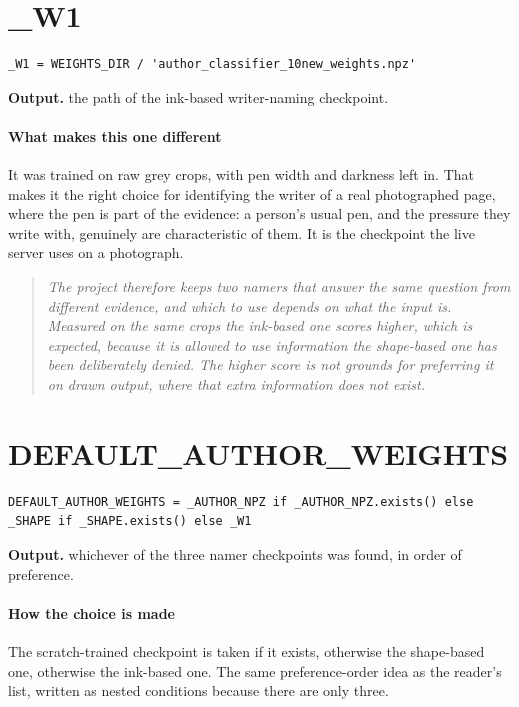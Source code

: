 \section{\_W1}
\begin{lstlisting}[style=sig]
_W1 = WEIGHTS_DIR / 'author_classifier_10new_weights.npz'
\end{lstlisting}

\noindent\textbf{Output.} the path of the ink-based writer-naming checkpoint.


\paragraph{What makes this one different}
It was trained on raw grey crops, with pen width and darkness left in. That makes it the right choice for identifying the writer of a real photographed page, where the pen is part of the evidence: a person's usual pen, and the pressure they write with, genuinely are characteristic of them. It is the checkpoint the live server uses on a photograph.


\begin{quote}\small\itshape The project therefore keeps two namers that answer the same question from different evidence, and which to use depends on what the input is. Measured on the same crops the ink-based one scores higher, which is expected, because it is allowed to use information the shape-based one has been deliberately denied. The higher score is not grounds for preferring it on drawn output, where that extra information does not exist.\end{quote}

\section{DEFAULT\_AUTHOR\_WEIGHTS}
\begin{lstlisting}[style=sig]
DEFAULT_AUTHOR_WEIGHTS = _AUTHOR_NPZ if _AUTHOR_NPZ.exists() else _SHAPE if _SHAPE.exists() else _W1
\end{lstlisting}

\noindent\textbf{Output.} whichever of the three namer checkpoints was found, in order of preference.


\paragraph{How the choice is made}
The scratch-trained checkpoint is taken if it exists, otherwise the shape-based one, otherwise the ink-based one. The same preference-order idea as the reader's list, written as nested conditions because there are only three.


